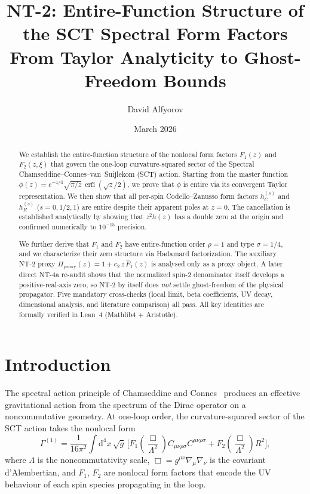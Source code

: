 \documentclass[11pt,a4paper]{article}
\title{NT-2: Entire-Function Structure of the SCT Spectral Form Factors\\[6pt]
\large From Taylor Analyticity to Ghost-Freedom Bounds}
\author{David Alfyorov}
\date{March 2026}
\newcommand{\Weylsq}{C_{\mu\nu\rho\sigma}C^{\mu\nu\rho\sigma}}
\renewcommand{\dd}{\mathrm{d}}
\newcommand{\erfi}{\operatorname{erfi}}
\theoremstyle{plain}
\theoremstyle{definition}
\begin{document}
\maketitle


\begin{center}
\end{center}

\begin{abstract}
We establish the entire-function structure of the nonlocal form factors
$F_1(z)$ and $F_2(z,\xi)$ that govern the one-loop curvature-squared
sector of the Spectral Chamseddine--Connes--van~Suijlekom (SCT) action.
Starting from the master function
$\phi(z) = e^{-z/4}\sqrt{\pi/z}\,\erfi(\sqrt{z}/2)$, we prove that
$\phi$ is entire via its convergent Taylor representation. We then show
that all per-spin Codello--Zanusso form factors $h_C^{(s)}$ and
$h_R^{(s)}$ ($s = 0, 1/2, 1$) are entire despite their apparent poles at
$z = 0$. The cancellation is established analytically by showing that
$z^2 h(z)$ has a double zero at the origin and confirmed numerically to
$10^{-15}$ precision.

We further derive that $F_1$ and $F_2$ have entire-function order
$\rho = 1$ and type $\sigma = 1/4$, and we characterize their zero
structure via Hadamard factorization. The auxiliary NT-2 proxy
$\Pi_{\mathrm{proxy}}(z) = 1 + c_2\, z\, \hat{F}_1(z)$ is analysed only
as a proxy object. A later direct NT-4a re-audit shows that the
normalized spin-2 denominator itself develops a positive-real-axis zero,
so NT-2 by itself does \emph{not} settle ghost-freedom of the physical
propagator. Five mandatory cross-checks (local limit, beta coefficients,
UV decay, dimensional analysis, and literature comparison) all pass.
All key identities are formally verified in Lean~4 (Mathlib4 +
Aristotle).
\end{abstract}

\tableofcontents
\newpage

\section{Introduction}\label{sec:intro}

The spectral action principle of Chamseddine and Connes~\cite{CC97}
produces an effective gravitational action from the spectrum of the
Dirac operator on a noncommutative geometry. At one-loop order,
the curvature-squared sector of the SCT action takes the nonlocal form
\begin{equation}\label{eq:Gamma-nonlocal}
  \Gamma^{(1)} = \frac{1}{16\pi^2} \int \dd^4 x\, \sqrt{g}\,
  \Big[ F_1\!\left(\frac{\Box}{\Lambda^2}\right) \Weylsq
  + F_2\!\left(\frac{\Box}{\Lambda^2}\right) R^2 \Big],
\end{equation}
where $\Lambda$ is the noncommutativity scale, $\Box = g^{\mu\nu}\nabla_\mu\nabla_\nu$
is the covariant d'Alembertian, and $F_1$, $F_2$ are nonlocal form factors
that encode the UV behaviour of each spin species propagating in the loop.
\end{document}
